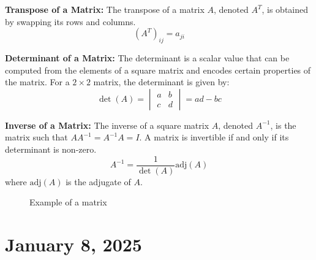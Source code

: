 \documentclass[11pt]{article}
\begin{document}
\textbf{Transpose of a Matrix:} The transpose of a matrix \(A\), denoted \(A^T\), is obtained by swapping its rows and columns.
\begin{equation}
    (A^T)_{ij} = a_{ji}
\end{equation}

\textbf{Determinant of a Matrix:} The determinant is a scalar value that can be computed from the elements of a square matrix and encodes certain properties of the matrix. For a \(2 \times 2\) matrix, the determinant is given by:
\begin{equation}
    \det(A) = \begin{vmatrix}
        a & b \\
        c & d
    \end{vmatrix} = ad - bc
\end{equation}

\textbf{Inverse of a Matrix:} The inverse of a square matrix \(A\), denoted \(A^{-1}\), is the matrix such that \(AA^{-1} = A^{-1}A = I\). A matrix is invertible if and only if its determinant is non-zero.
\begin{equation}
    A^{-1} = \frac{1}{\det(A)} \text{adj}(A)
\end{equation}
where \(\text{adj}(A)\) is the adjugate of \(A\).

\begin{figure}[h]
    \centering
    \caption{Example of a matrix}
\end{figure}

\section{January 8, 2025}
\end{document}
